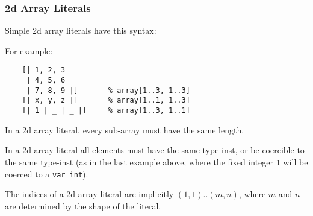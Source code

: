 \documentclass[10pt]{scrartcl}
\newcommand{\ignore}[1]{}
\begin{document}
\subsubsection{2d Array Literals}
        \label{2d Array Literals}
Simple 2d array literals have this syntax:
\begin{productions}
    \RuleSimpleArrayLiteralTwoD
\end{productions}
For example:
\begin{verbatim}
    [| 1, 2, 3
     | 4, 5, 6
     | 7, 8, 9 |]       % array[1..3, 1..3]
    [| x, y, z |]       % array[1..1, 1..3]
    [| 1 | _ | _ |]     % array[1..3, 1..1]
\end{verbatim}

In a 2d array literal, every sub-array must have the same length.

In a 2d array literal all elements must have the same type-inst, or
be coercible to the same type-inst (as in the last example above, where the
fixed integer \texttt{1} will be coerced to a \texttt{var int}).

The indices of a 2d array literal are implicitly $(1,1)..(m,n)$,
where $m$ and $n$ are determined by the shape of the literal.

\ignore{
\subsubsection{Indexed Array Literals}
        \label{Indexed Array Literals}
Indexed array literals have this syntax:
\begin{productions}
    \RuleIndexedArrayLiteral \\
    \RuleIndexExpr
\end{productions}
For example:
\begin{verbatim}
    [1:1, 2:4, 3:3, 4:10, 5:5]
\end{verbatim}
The expressions before the colon are keys, those after are values.

In an indexed array literal all keys must have the same type-inst or be
coercible to the same type-inst, and all values must have the same
type-inst or be coercible to the same type-inst.

The keys need not be specified in order.
}
\end{document}
